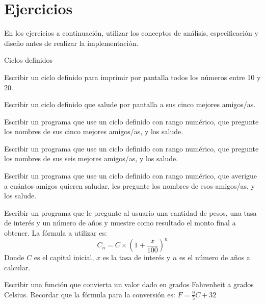 \section{Ejercicios}

\begin{extract*}
En los ejercicios a continuación, utilizar los conceptos de análisis,
especificación y diseño antes de realizar la implementación.
\end{extract*}

\begin{ejercicio} Ciclos definidos
\begin{partes}
	\item Escribir un ciclo definido para imprimir por pantalla
todos los números entre 10 y 20.
	\item Escribir un ciclo definido que salude por pantalla a
sus cinco mejores amigos/as.
	\item Escribir un programa que use un ciclo definido con
rango numérico, que pregunte los nombres de sus cinco mejores
amigos/as, y los salude.
	\item Escribir un programa que use un ciclo definido con
rango numérico, que pregunte los nombres de sus seis mejores
amigos/as, y los salude.
	\item Escribir un programa que use un ciclo definido con
rango numérico, que averigue a cuántos amigos quieren saludar, les
pregunte los nombres de esos amigos/as, y los salude.
\end{partes}
\end{ejercicio}

\begin{ejercicio}
Escribir un programa que le pregunte al usuario una cantidad de pesos,
una tasa de interés y un número de años y muestre como resultado el monto
final a obtener.  La fórmula a utilizar es:
\begin{displaymath}
C_n = C \times \left(1+\frac{x}{100}\right)^n
\end{displaymath}
Donde $C$ es el capital inicial, $x$ es la tasa de interés y $n$ es el
número de años a calcular.
\end{ejercicio}

\begin{ejercicio}
Escribir una función que convierta un valor dado en grados Fahrenheit a
grados Celsius.  Recordar que la fórmula para la conversión es:
$F = \frac{9}{5}C+32$
\end{ejercicio}

